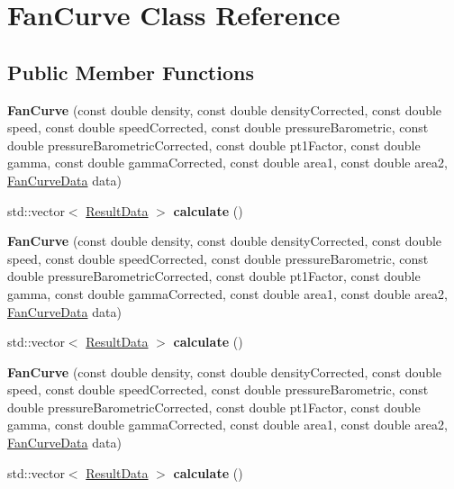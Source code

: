 \hypertarget{class_fan_curve}{}\section{Fan\+Curve Class Reference}
\label{class_fan_curve}
\subsection*{Public Member Functions}
\begin{DoxyCompactItemize}
\item 
\mbox{\label{class_fan_curve_aadde731da2ac3cd6a924e6d23454f3f7}} 
{\bfseries Fan\+Curve} (const double density, const double density\+Corrected, const double speed, const double speed\+Corrected, const double pressure\+Barometric, const double pressure\+Barometric\+Corrected, const double pt1\+Factor, const double gamma, const double gamma\+Corrected, const double area1, const double area2, \hyperlink{class_fan_curve_data}{Fan\+Curve\+Data} data)
\item 
\mbox{\label{class_fan_curve_acd1ec595f476b74718479bbb66e778ec}} 
std\+::vector$<$ \hyperlink{class_result_data}{Result\+Data} $>$ {\bfseries calculate} ()
\item 
\mbox{\label{class_fan_curve_aadde731da2ac3cd6a924e6d23454f3f7}} 
{\bfseries Fan\+Curve} (const double density, const double density\+Corrected, const double speed, const double speed\+Corrected, const double pressure\+Barometric, const double pressure\+Barometric\+Corrected, const double pt1\+Factor, const double gamma, const double gamma\+Corrected, const double area1, const double area2, \hyperlink{class_fan_curve_data}{Fan\+Curve\+Data} data)
\item 
\mbox{\label{class_fan_curve_a840e57c91c27a5c1d05ecdd56ccee0b2}} 
std\+::vector$<$ \hyperlink{class_result_data}{Result\+Data} $>$ {\bfseries calculate} ()
\item 
\mbox{\label{class_fan_curve_aadde731da2ac3cd6a924e6d23454f3f7}} 
{\bfseries Fan\+Curve} (const double density, const double density\+Corrected, const double speed, const double speed\+Corrected, const double pressure\+Barometric, const double pressure\+Barometric\+Corrected, const double pt1\+Factor, const double gamma, const double gamma\+Corrected, const double area1, const double area2, \hyperlink{class_fan_curve_data}{Fan\+Curve\+Data} data)
\item 
\mbox{\label{class_fan_curve_a840e57c91c27a5c1d05ecdd56ccee0b2}} 
std\+::vector$<$ \hyperlink{class_result_data}{Result\+Data} $>$ {\bfseries calculate} ()
\end{DoxyCompactItemize}


